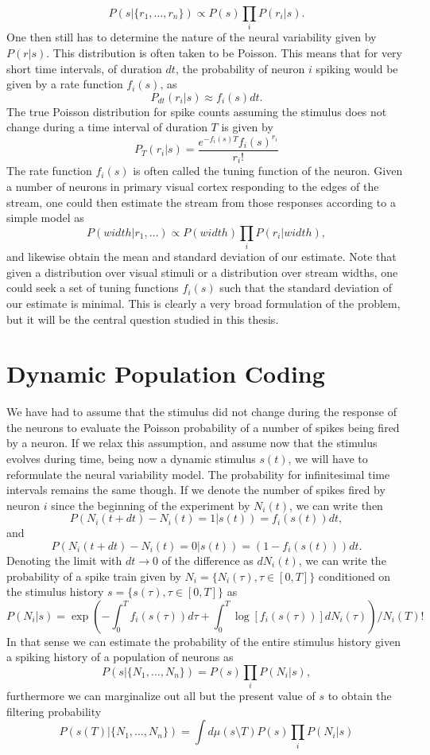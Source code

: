 \[
P(s|\{r_1,\ldots,r_n\}) \propto P(s) \prod_i P(r_i|s).
\]
One then still has to determine the nature of the neural variability given by $P(r|s)$. This distribution is often taken to be Poisson. This means that for very short time intervals, of duration $dt$, the probability of neuron $i$ spiking would be given by a rate function $f_i(s)$, as
\[
P_{dt}(r_i|s) \approx f_i(s) dt.
\]
The true Poisson distribution for spike counts assuming the stimulus does not change during a time interval of duration $T$ is given by
\[
P_T(r_i|s) = \frac{e^{-f_i(s) T}f_i(s)^{r_i}}{r_i!}
\]
The rate function $f_i(s)$ is often called the tuning function of the neuron. Given a number of neurons in primary visual cortex responding to the edges of the stream, one could then estimate the stream from those responses according to a simple model as
\[
P(width|{r_1,\ldots}) \propto P(width) \prod_i P(r_i|width),
\]
and likewise obtain the mean and standard deviation of our estimate. Note that given a distribution over visual stimuli or a distribution over stream widths, one could seek a set of tuning functions $f_i(s)$ such that the standard deviation of our estimate is minimal. This is clearly a very broad formulation of the problem, but it will be the central question studied in this thesis.

\section{Dynamic Population Coding}

We have had to assume that the stimulus did not change during the response of the neurons to evaluate the Poisson probability of a number of spikes being fired by a neuron. If we relax this assumption, and assume now that the stimulus evolves during time, being now a dynamic stimulus $s(t)$, we will have to reformulate the neural variability model. The probability for infinitesimal time intervals remains the same though. If we denote the number of spikes fired by neuron $i$ since the beginning of the experiment by $N_i(t)$, we can write then
\[
P(N_i(t+dt) - N_i(t) = 1|s(t)) = f_i\left(s(t)\right) dt,
\]
and 
\[
P(N_i(t+dt) - N_i(t) = 0|s(t)) = (1-f_i\left(s(t)\right)) dt.
\]
Denoting the limit with $dt\to 0$ of the difference as $dN_i(t)$, we can write the probability of a spike train given by $N_i = \{N_i(\tau), \tau \in [0,T]\}$ conditioned on the stimulus history $s = \{s(\tau), \tau \in [0,T]\}$ as
\[
P(N_i|s) = \exp\left(-\int_0^T f_i(s(\tau)) d\tau + \int_0^T \log\left[f_i(s(\tau))\right] dN_i(\tau) \right)/N_i(T)!
\]
In that sense we can estimate the probability of the entire stimulus history given a spiking history of a population of neurons as
\[
P(s|\{N_1,\ldots,N_n\}) = P(s) \prod_i P(N_i|s),
\]
furthermore we can marginalize out all but the present value of $s$ to obtain the filtering probability
\[
P(s(T)|\{N_1,\ldots,N_n\}) = \int d\mu(s\setminus T) P(s) \prod_i P(N_i|s)
\]

